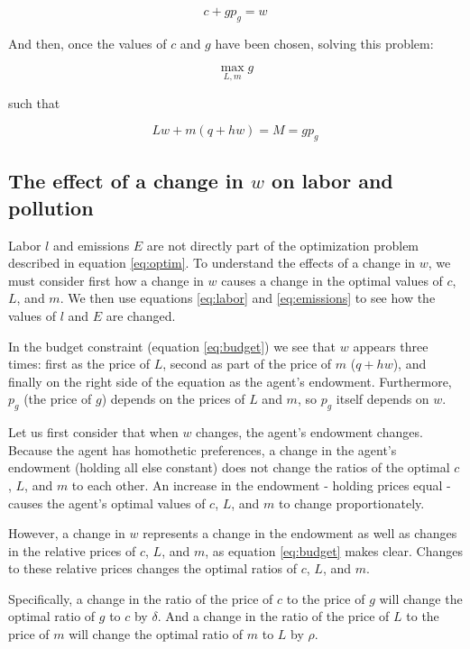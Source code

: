 \documentclass[letter, 12pt, epsf,leqno]{article}
\begin{document}
\begin{equation}c + gp_g=w\end{equation}

And then, once the values of $c$ and $g$ have been chosen, solving this problem:

\begin{equation}\max_{L, m} g\end{equation}

such that

\begin{equation}Lw + m(q+hw) = M = gp_g\end{equation}

\subsection{The effect of a change in $w$ on labor and pollution}

Labor $l$ and emissions $E$ are not directly part of the optimization problem described in equation \ref{eq:optim}.  To understand the effects of a change in $w$, we must consider first how a change in $w$ causes a change in the optimal values of $c$, $L$, and $m$.  We then use equations \ref{eq:labor} and \ref{eq:emissions} to see how the values of $l$ and $E$ are changed.

In the budget constraint (equation \ref{eq:budget}) we see that $w$ appears three times: first as the price of $L$, second as part of the price of $m$ ($q+hw$), and finally on the right side of the equation as the agent's endowment.  Furthermore, $p_g$ (the price of $g$) depends on the prices of $L$ and $m$, so $p_g$ itself depends on $w$.  

Let us first consider that when $w$ changes, the agent's endowment changes.  Because the agent has homothetic preferences, a change in the agent's endowment (holding all else constant) does not change the ratios of the optimal $c$, $L$, and $m$ to each other.  An increase in the endowment - holding prices equal - causes the agent's optimal values of $c$, $L$, and $m$ to change proportionately.

However, a change in $w$ represents a change in the endowment as well as changes in the relative prices of $c$, $L$, and $m$, as equation \ref{eq:budget} makes clear.  Changes to these relative prices changes the optimal ratios of $c$, $L$, and $m$.

Specifically, a change in the ratio of the price of $c$ to the price of $g$ will change the optimal ratio of $g$ to $c$ by $\delta$.  And a change in the ratio of the price of $L$ to the price of $m$ will change the optimal ratio of $m$ to $L$ by $\rho$. 
\end{document}
